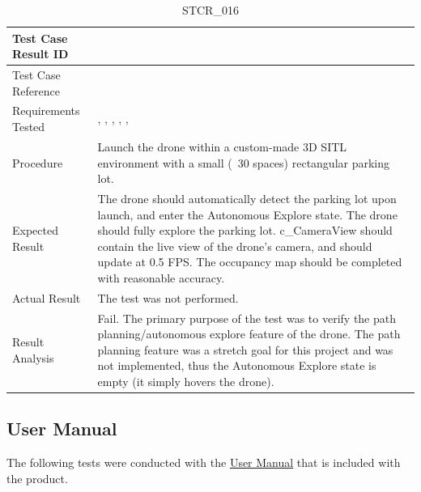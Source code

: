 \documentclass[12pt, titlepage]{article}
\begin{document}
\begin{table}[!h]
\begin{center}
\caption {STCR\_016}
\label{tab:STCR_016}
\begin{tabular}{ | m{3.2cm} | m{12.2cm} | } 
\hline
Test Case Result ID & \nameref{tab:STCR_016} \\ 
\hline
Test Case Reference & \nameref{tab:STC_016}  \\ 
\hline
Requirements Tested & \nameref{GEN_001}, \nameref{GEN_002}, \nameref{GEN_005}, \nameref{GEN_006}, \nameref{STA_003}, \nameref{TRANS_003}
\\ 
\hline
Procedure & Launch the drone within a custom-made 3D SITL environment with a small (~30 spaces) rectangular parking lot.  \\
\hline
Expected Result & The drone should automatically detect the parking lot upon launch, and enter the Autonomous Explore state. The drone should fully explore the parking lot. c\_CameraView should contain the live view of the drone's camera, and should update at 0.5 FPS. The occupancy map should be completed with reasonable accuracy.  \\ 
\hline
Actual Result &  The test was not performed. \\
\hline
Result Analysis & Fail. The primary purpose of the test was to verify the path planning/autonomous explore feature of the drone. The path planning feature was a stretch goal for this project and was not implemented, thus the Autonomous Explore state is empty (it simply hovers the drone).    \\ 
\hline
\end{tabular}
\end{center}
\end{table}

\clearpage

\subsection{User Manual}
The following tests were conducted with the \href{https://github.com/icecap360/DroneCapstone/blob/master/docs/UserManual/UserManual.pdf}{User Manual} that is included with the product.
\end{document}
